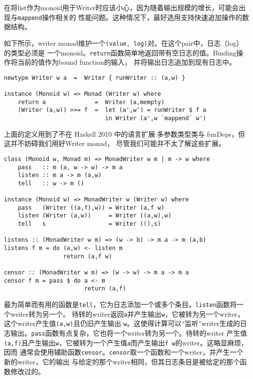\indent{}在将list作为monoid用于Writer时应该小心，因为随着输出规模的增长，可能会出现与\texttt{mappend}操作相关的
性能问题。这种情况下，最好选用支持快速追加操作的数据结构。

\indent{}如下所示，writer monad维护一个\texttt{(value, log)}对。在这个pair中，日志（log）的类型必须是
一个monoid。\texttt{return}函数简单地返回带有空日志的值。Binding操作将当前的值作为bound function的输入，
并将输出日志追加到现有日志中。
\begin{verbatim}
newtype Writer w a  =  Writer { runWriter :: (a,w) }

instance (Monoid w) => Monad (Writer w) where
    return a              =  Writer (a,mempty)
    (Writer (a,w)) >>= f  =  let (a',w') = runWriter $ f a
                             in Writer (a',w `mappend` w')
\end{verbatim}

\indent{}上面的定义用到了不在 Haskell 2010 中的语言扩展:多参数类型类与 funDeps，但这并不妨碍我们用好Writer monad，
尽管我们可能并不太了解这些扩展。
\begin{verbatim}
class (Monoid w, Monad m) => MonadWriter w m | m -> w where
    pass   :: m (a, w -> w) -> m a
    listen :: m a -> m (a,w)
    tell   :: w -> m ()

instance (Monoid w) => MonadWriter w (Writer w) where
    pass   (Writer ((a,f),w)) = Writer (a,f w)
    listen (Writer (a,w))     = Writer ((a,w),w)
    tell   s                  = Writer ((),s)

listens :: (MonadWriter w m) => (w -> b) -> m a -> m (a,b)
listens f m = do (a,w) <- listen m
                 return (a,f w)

censor :: (MonadWriter w m) => (w -> w) -> m a -> m a
censor f m = pass $ do a <- m
                       return (a,f)
\end{verbatim}
\noindent{}最为简单而有用的函数是\texttt{tell}，它为日志添加一个或多个条目。\texttt{listen}函数将一个writer转为另一个。
待转的writer返回\texttt{a}并产生输出\texttt{w}，它被转为另一个writer，这个writer产生值\texttt{(a,w)}且仍旧产生输出
\texttt{w}。这使得计算可以“监听”writer生成的日志输出。\texttt{pass}函数有点复杂，它也将一个writer转为另一个。待转的writer
产生值\texttt{(a,f)}且产生输出\texttt{w}，它被转为一个产生值\texttt{a}而产生输出\texttt{f w}的writer。这略显麻烦，因而
通常会使用辅助函数\texttt{censor}。\texttt{censor}取一个函数和一个writer，并产生一个新的writer，它的输出
与给定的那个writer相同，但其日志条目是被给定的那个函数修改过的。

